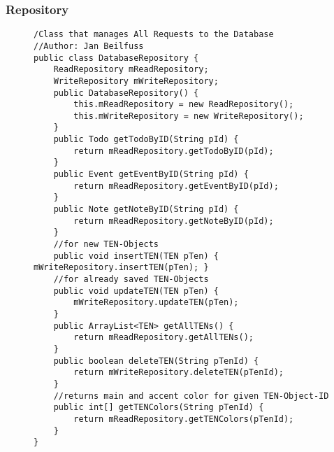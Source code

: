 	\subsubsection{Repository}
\begin{figure}[H]
\begin{lstlisting}[caption=DatabaseRepository (Jan Beilfuß)]
/Class that manages All Requests to the Database
//Author: Jan Beilfuss
public class DatabaseRepository {
    ReadRepository mReadRepository;
    WriteRepository mWriteRepository;
    public DatabaseRepository() {
        this.mReadRepository = new ReadRepository();
        this.mWriteRepository = new WriteRepository();
    }
    public Todo getTodoByID(String pId) {
        return mReadRepository.getTodoByID(pId);
    }
    public Event getEventByID(String pId) {
        return mReadRepository.getEventByID(pId);
    }
    public Note getNoteByID(String pId) {
        return mReadRepository.getNoteByID(pId);
    }
    //for new TEN-Objects
    public void insertTEN(TEN pTen) { mWriteRepository.insertTEN(pTen); }
    //for already saved TEN-Objects
    public void updateTEN(TEN pTen) {
        mWriteRepository.updateTEN(pTen);
    }
    public ArrayList<TEN> getAllTENs() {
        return mReadRepository.getAllTENs();
    }
    public boolean deleteTEN(String pTenId) {
        return mWriteRepository.deleteTEN(pTenId);
    }
    //returns main and accent color for given TEN-Object-ID
    public int[] getTENColors(String pTenId) {
        return mReadRepository.getTENColors(pTenId);
    }
}
\end{lstlisting}
\end{figure}

